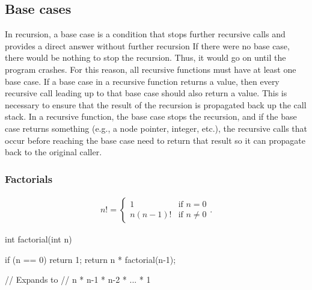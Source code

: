 \documentclass{report}
\begin{document}
    \bigbreak \noindent 
    \subsection{Base cases}
    \bigbreak \noindent 
    In recursion, a base case is a condition that stops further recursive calls and provides a direct answer without further recursion
    \bigbreak \noindent 
    If there were no base case, there would be nothing to stop the recursion. Thus, it would go on until the program crashes. For this reason, all recursive functions must have at least one base case.
    \bigbreak \noindent 
    If a base case in a recursive function returns a value, then every recursive call leading up to that base case should also return a value. This is necessary to ensure that the result of the recursion is propagated back up the call stack.
    \bigbreak \noindent 
    In a recursive function, the base case stops the recursion, and if the base case returns something (e.g., a node pointer, integer, etc.), the recursive calls that occur before reaching the base case need to return that result so it can propagate back to the original caller.

    \bigbreak \noindent 
    \subsubsection{Factorials}
    \bigbreak \noindent 
    \begin{align*}
        n! = 
        \begin{cases}
            1 & \text{if } n = 0 \\
            n(n-1)! & \text{if } n \ne 0
        \end{cases}
    .\end{align*}
    \bigbreak \noindent 
    \begin{cppcode}
        int factorial(int n) {
            if (n == 0) return 1;
            return n * factorial(n-1);

            // Expands to 
            // n * n-1 * n-2 * ... * 1
        }
    \end{cppcode}

    \bigbreak \noindent 
\end{document}

